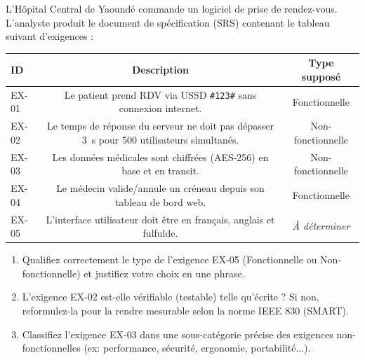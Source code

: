 \documentclass[11pt]{article}
\begin{document}
\begin{exercice}
L'Hôpital Central de Yaoundé commande un logiciel de prise de rendez-vous. L'analyste produit le document de spécification (SRS) contenant le tableau suivant d'exigences :

\begin{tabularx}{\linewidth}{|X|c|c|}
\hline
\textbf{ID} & \textbf{Description} & \textbf{Type supposé} \\
\hline
EX-01 & Le patient prend RDV via USSD \texttt{\#123\#} sans connexion internet. & Fonctionnelle \\
EX-02 & Le temps de réponse du serveur ne doit pas dépasser \SI{3}{\second} pour 500 utilisateurs simultanés. & Non-fonctionnelle \\
EX-03 & Les données médicales sont chiffrées (AES-256) en base et en transit. & Non-fonctionnelle \\
EX-04 & Le médecin valide/annule un créneau depuis son tableau de bord web. & Fonctionnelle \\
EX-05 & L'interface utilisateur doit être en français, anglais et fulfulde. & \textit{À déterminer} \\
\hline
\end{tabularx}

\begin{enumerate}
    \item Qualifiez correctement le type de l'exigence EX-05 (Fonctionnelle ou Non-fonctionnelle) et justifiez votre choix en une phrase.
    \item L'exigence EX-02 est-elle vérifiable (testable) telle qu'écrite ? Si non, reformulez-la pour la rendre mesurable selon la norme IEEE 830 (SMART).
    \item Classifiez l'exigence EX-03 dans une sous-catégorie précise des exigences non-fonctionnelles (ex: performance, sécurité, ergonomie, portabilité...).
\end{enumerate}
\end{exercice}
\end{document}
